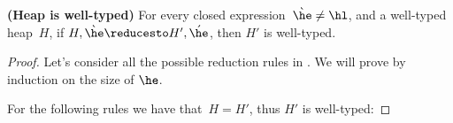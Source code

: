 \documentclass[a4paper]{article}
\begin{document}
\begin{Lemma}
  \textbf{(Heap is well-typed)}
    For every closed expression~$\grave{\he} \neq \hl$, and a well-typed heap~$H$,
        if $H,\grave{\he} \reducesto H',\acute{\he}$,
        then $H'$ is well-typed.
\end{Lemma}
\begin{proof}
Let's consider all the possible reduction rules in .
We will prove by induction on the size of $\he$.

For the following rules we have that~$H=H'$, thus $H'$ is well-typed:



\end{proof}

%
\end{document}
